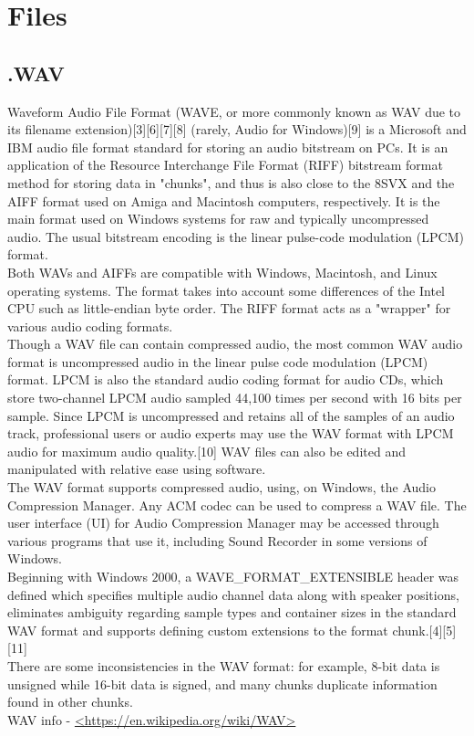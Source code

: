 \chapter{Files}\label{ch:ch3label}
\section{.WAV}

Waveform Audio File Format (WAVE, or more commonly known as WAV due to its filename extension)[3][6][7][8] (rarely, Audio for Windows)[9] is a Microsoft and IBM audio file format standard for storing an audio bitstream on PCs. It is an application of the Resource Interchange File Format (RIFF) bitstream format method for storing data in "chunks", and thus is also close to the 8SVX and the AIFF format used on Amiga and Macintosh computers, respectively. It is the main format used on Windows systems for raw and typically uncompressed audio. The usual bitstream encoding is the linear pulse-code modulation (LPCM) format.\\

Both WAVs and AIFFs are compatible with Windows, Macintosh, and Linux operating systems. The format takes into account some differences of the Intel CPU such as little-endian byte order. The RIFF format acts as a "wrapper" for various audio coding formats.\\
Though a WAV file can contain compressed audio, the most common WAV audio format is uncompressed audio in the linear pulse code modulation (LPCM) format. LPCM is also the standard audio coding format for audio CDs, which store two-channel LPCM audio sampled 44,100 times per second with 16 bits per sample. Since LPCM is uncompressed and retains all of the samples of an audio track, professional users or audio experts may use the WAV format with LPCM audio for maximum audio quality.[10] WAV files can also be edited and manipulated with relative ease using software.\\
The WAV format supports compressed audio, using, on Windows, the Audio Compression Manager. Any ACM codec can be used to compress a WAV file. The user interface (UI) for Audio Compression Manager may be accessed through various programs that use it, including Sound Recorder in some versions of Windows.\\
Beginning with Windows $2000$, a WAVE\_FORMAT\_EXTENSIBLE header was defined which specifies multiple audio channel data along with speaker positions, eliminates ambiguity regarding sample types and container sizes in the standard WAV format and supports defining custom extensions to the format chunk.[4][5][11]\\
There are some inconsistencies in the WAV format: for example, 8-bit data is unsigned while 16-bit data is signed, and many chunks duplicate information found in other chunks.\\

WAV info - \url{<https://en.wikipedia.org/wiki/WAV>}


